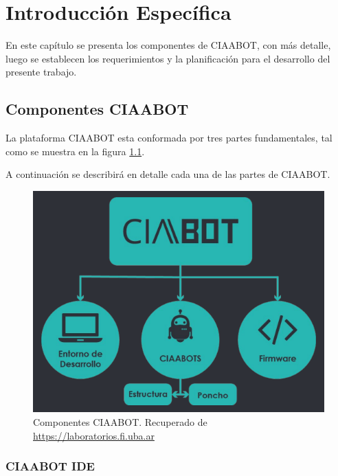 \chapter{Introducción Específica} %

\label{Chapter2}

En este capítulo se presenta los componentes de CIAABOT, con más detalle, luego se establecen los requerimientos y
la planificación para el desarrollo del presente trabajo.

\section{Componentes CIAABOT}
\label{sec:Componentes CIAABOT}
La plataforma CIAABOT esta conformada por tres partes fundamentales, tal como se muestra en la figura \ref{fig:componentesCiaabot}. 

A continuación se describirá en detalle cada una de las partes de CIAABOT.

\begin{figure}[h]
	\centering
	\includegraphics[scale=.50]{./Figures/componentesCiabot.png}
	\caption{Componentes CIAABOT. Recuperado de \url{https://laboratorios.fi.uba.ar}}
	\label{fig:componentesCiaabot}
\end{figure}

\subsection{CIAABOT IDE}

